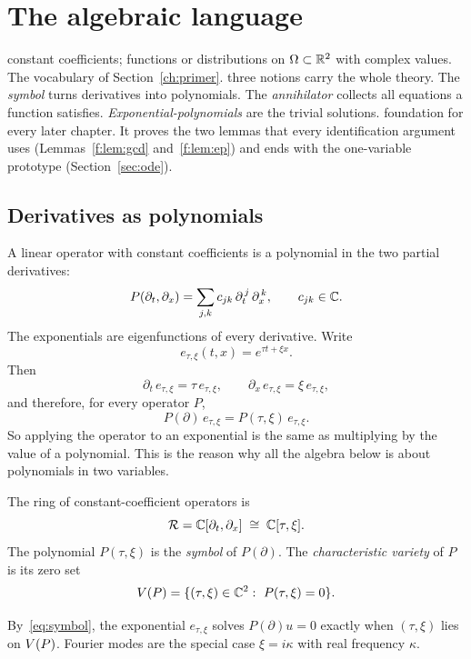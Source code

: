 \section{The algebraic language}\label{f:ch:algebra}
\sectionbrief
{constant coefficients; functions or distributions on $\Omega\subset\mathbb{R}^2$ with complex values. The vocabulary of Section~\ref{ch:primer}.}
{three notions carry the whole theory. The \emph{symbol} turns derivatives into polynomials. The \emph{annihilator} collects all equations a function satisfies. \emph{Exponential-polynomials} are the trivial solutions.}
{foundation for every later chapter. It proves the two lemmas that every identification argument uses (Lemmas~\ref{f:lem:gcd} and~\ref{f:lem:ep}) and ends with the one-variable prototype (Section~\ref{sec:ode}).}

\subsection{Derivatives as polynomials}

A linear operator with constant coefficients is a polynomial in the two partial derivatives:
\[
P(\partial_t,\partial_x)=\sum_{j,k}c_{jk}\,\partial_t^{\,j}\,\partial_x^{\,k},\qquad c_{jk}\in\mathbb{C} .
\]
The exponentials are eigenfunctions of every derivative. Write
\[
e_{\tau,\xi}(t,x)=e^{\tau t+\xi x}.
\]
Then
\[
\partial_t\,e_{\tau,\xi}=\tau\,e_{\tau,\xi},\qquad
\partial_x\,e_{\tau,\xi}=\xi\,e_{\tau,\xi},
\]
and therefore, for every operator $P$,
\begin{equation}\label{eq:symbol}
P(\partial)\,e_{\tau,\xi}=P(\tau,\xi)\,e_{\tau,\xi}.
\end{equation}
So applying the operator to an exponential is the same as multiplying by the value of a polynomial. This is the reason why all the algebra below is about polynomials in two variables.

\begin{definition}\label{f:def:ring}
The ring of constant-coefficient operators is
\[
\mathcal{R}=\mathbb{C}[\partial_t,\partial_x]\;\cong\;\mathbb{C}[\tau,\xi].
\]
The polynomial $P(\tau,\xi)$ is the \emph{symbol} of $P(\partial)$. The \emph{characteristic variety} of $P$ is its zero set
\[
\Var(P)=\{(\tau,\xi)\in\C^2:\ P(\tau,\xi)=0\}.
\]
\end{definition}

By~\eqref{eq:symbol}, the exponential $e_{\tau,\xi}$ solves $P(\partial)u=0$ exactly when $(\tau,\xi)$ lies on $V(P)$. Fourier modes are the special case $\xi=i\kappa$ with real frequency $\kappa$.

